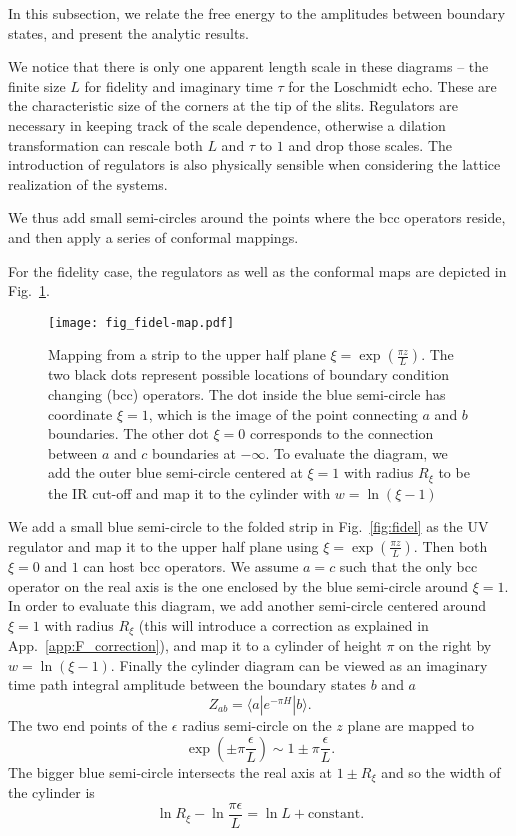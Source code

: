 
In this subsection, we relate the free energy to the amplitudes between boundary states, and present the analytic results. 

We notice that there is only one apparent length scale in these diagrams -- the finite size $L$ for fidelity and imaginary time $\tau$ for the Loschmidt echo. These are the characteristic size of the corners at the tip of the slits. Regulators are necessary in keeping track of the scale dependence, otherwise a dilation transformation can rescale both $L$ and $\tau$ to $1$ and drop those scales. The introduction of regulators is also physically sensible when considering the lattice realization of the systems. 

We thus add small semi-circles around the points where the bcc operators reside, and then apply a series of conformal mappings. 

For the fidelity case, the regulators as well as the conformal maps are depicted in Fig.~\ref{fig:fidel-map}. 
\begin{figure}[h]
\centering
\texttt{[image: fig\_fidel-map.pdf]}
\caption{Mapping from a strip to the upper half plane $\xi  = \exp( \frac{\pi z}{L} ) $. The two black dots represent possible locations of boundary condition changing (bcc) operators. The dot inside the blue semi-circle has coordinate $\xi = 1$, which is the image of the point connecting $a$ and $b$ boundaries. The other dot $\xi = 0$ corresponds to the connection between $a$ and $c$ boundaries at $- \infty$. To evaluate the diagram, we add the outer blue semi-circle centered at $\xi = 1$ with radius $R_{\xi}$ to be the IR cut-off and map it to the cylinder with $w = \ln(\xi - 1)$}
\label{fig:fidel-map}
\end{figure}
We add a small blue semi-circle to the folded strip in Fig.~\ref{fig:fidel} as the UV regulator and map it to the upper half plane using $\xi  = \exp( \frac{\pi z}{L} )$. Then both $\xi = 0$ and $1$ can host bcc operators. We assume $a = c$ such that the only bcc operator on the real axis is the one enclosed by the blue semi-circle around $\xi = 1$. In order to evaluate this diagram, we add another semi-circle centered around $\xi = 1$ with radius $R_{\xi}$ (this will introduce a correction as explained in App.~\ref{app:F_correction}), and map it to a cylinder of height $\pi$ on the right by $w = \ln ( \xi- 1)$. Finally the cylinder diagram can be viewed as an imaginary time path integral amplitude between the boundary states $b$ and $a$
\begin{equation}
\label{eq:partition_fun}
Z_{ab} = \langle a | e^{-\pi H } |b \rangle.
\end{equation}
The two end points of the $\epsilon$ radius semi-circle on the $z$ plane are mapped to
\begin{equation}
\exp( \pm \pi \frac{\epsilon}{ L}  ) \sim 1 \pm \pi \frac{\epsilon}{L} .
\end{equation}
The bigger blue semi-circle intersects the real axis at $1 \pm R_{\xi}$ and so the width of the cylinder is 
\begin{equation}
\label{eq:fidel_cyd_width}
\ln R_{\xi} - \ln \frac{\pi \epsilon}{L} = \ln L + \text{constant}.
\end{equation}

